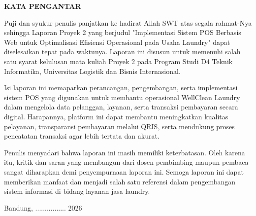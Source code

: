 \begin{center}
    {\fontsize{14}{16}\selectfont\bfseries KATA PENGANTAR}
\end{center}

\vspace{0.5cm}

\begin{onehalfspacing} %
\noindent
Puji dan syukur penulis panjatkan ke hadirat Allah SWT atas segala rahmat-Nya sehingga Laporan Proyek 2 yang berjudul "Implementasi Sistem POS Berbasis Web untuk Optimalisasi Efisiensi Operasional pada Usaha Laundry" dapat diselesaikan tepat pada waktunya. Laporan ini disusun untuk memenuhi salah satu syarat kelulusan mata kuliah Proyek 2 pada Program Studi D4 Teknik Informatika, Universitas Logistik dan Bisnis Internasional.


\noindent
Isi laporan ini memaparkan perancangan, pengembangan, serta implementasi sistem POS yang digunakan untuk membantu operasional WellClean Laundry dalam mengelola data pelanggan, layanan, serta transaksi pembayaran secara digital. Harapannya, platform ini dapat membantu meningkatkan kualitas pelayanan, transparansi pembayaran melalui QRIS, serta mendukung proses pencatatan transaksi agar lebih tertata dan akurat.


\noindent
Penulis menyadari bahwa laporan ini masih memiliki keterbatasan. Oleh karena itu, kritik dan saran yang membangun dari dosen pembimbing maupun pembaca sangat diharapkan demi penyempurnaan laporan ini. Semoga laporan ini dapat memberikan manfaat dan menjadi salah satu referensi dalam pengembangan sistem informasi di bidang layanan jasa laundry.

\vspace{1.5cm}

\begin{flushright}
    Bandung, ................ 2026 \pagebreak[0] %
    
    \vspace{2cm}
\end{flushright}
\end{onehalfspacing}